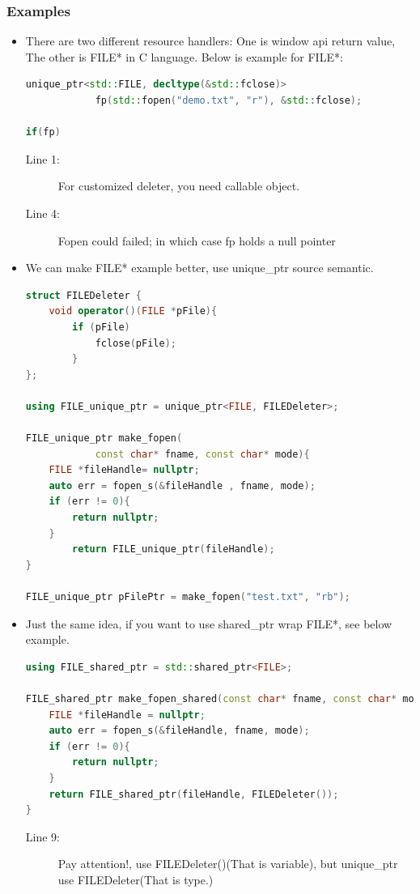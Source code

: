 \documentclass[a4paper,11pt,twoside]{book}
\begin{document}
\subsubsection{Examples}
\begin{itemize}
	\item There are two different resource handlers: One is window api return value, The other is FILE* in C language. Below is example for FILE*:
	
\begin{lstlisting}[frame=single, language=c++]
unique_ptr<std::FILE, decltype(&std::fclose)> 
			fp(std::fopen("demo.txt", "r"), &std::fclose);
			
if(fp) 
\end{lstlisting}
\begin{description}
	\item[Line 1:] For customized deleter, you need callable object.
	\item[Line 4:] Fopen could failed; in which case fp holds a null pointer
\end{description}
	
	\item We can make FILE* example better, use unique\_ptr source semantic.
\begin{lstlisting}[frame=single, language=c++]
struct FILEDeleter {
	void operator()(FILE *pFile){
		if (pFile)
			fclose(pFile);
		}
};
	
using FILE_unique_ptr = unique_ptr<FILE, FILEDeleter>;
	
FILE_unique_ptr make_fopen(
			const char* fname, const char* mode){
	FILE *fileHandle= nullptr;
	auto err = fopen_s(&fileHandle , fname, mode); 
	if (err != 0){
		return nullptr;
	}
		return FILE_unique_ptr(fileHandle);
}
	
FILE_unique_ptr pFilePtr = make_fopen("test.txt", "rb");
\end{lstlisting}
	
\item Just the same idea, if you want to use shared\_ptr wrap FILE*, see below example.
\begin{lstlisting}[frame=single, language=c++]
using FILE_shared_ptr = std::shared_ptr<FILE>;
	
FILE_shared_ptr make_fopen_shared(const char* fname, const char* mode){
	FILE *fileHandle = nullptr;
	auto err = fopen_s(&fileHandle, fname, mode);
	if (err != 0){
		return nullptr;
	}
	return FILE_shared_ptr(fileHandle, FILEDeleter());
}
\end{lstlisting}
\begin{description}
	\item[Line 9:] Pay attention!, use FILEDeleter()(That is variable), but unique\_ptr use FILEDeleter(That is type.)
\end{description}


\end{itemize}
\end{document}
